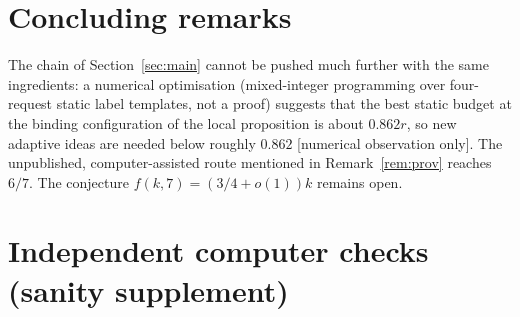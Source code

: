 \documentclass[11pt]{amsart}
\theoremstyle{definition}
\theoremstyle{remark}
\begin{document}
\section{Concluding remarks}

The chain of Section~\ref{sec:main} cannot be pushed much further with the same ingredients: a numerical optimisation (mixed-integer programming over four-request static label templates, not a proof) suggests that the best static budget at the binding configuration of the local proposition is about $0.862r$, so new adaptive ideas are needed below roughly $0.862$ [numerical observation only]. The unpublished, computer-assisted route mentioned in Remark~\ref{rem:prov} reaches $6/7$. The conjecture $f(k,7)=(3/4+o(1))k$ remains open.

\appendix
\section{Independent computer checks (sanity supplement)}\label{app:checks}
\end{document}
